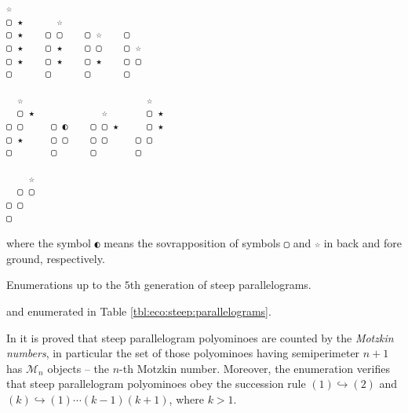 \begin{example}
\begin{margintable}
\begin{Verbatim}[baselinestretch=0.5,fontsize=\footnotesize]
☆
▢ ★      ☆
▢ ★    ▢ ▢    ▢ ☆    ▢
▢ ★    ▢ ★    ▢ ▢    ▢ ☆
▢ ★    ▢ ★    ▢ ★    ▢ ▢
▢      ▢      ▢      ▢

  ☆                      ☆
  ▢ ★            ☆       ▢ ★
▢ ▢     ▢ ◐    ▢ ▢ ★     ▢ ★
▢ ★     ▢ ▢    ▢ ▢     ▢ ▢
▢       ▢      ▢       ▢

    ☆
  ▢ ▢
▢ ▢
▢
\end{Verbatim}
where the symbol \verb|◐| means the sovrapposition of symbols \verb|▢| and
\verb|☆| in back and fore ground, respectively.
\caption{Enumerations up to the $5$th generation of steep parallelograms.}
\label{tbl:eco:steep:parallelograms}
\end{margintable}

and enumerated in Table \ref{tbl:eco:steep:parallelograms}.
\end{example}

In \citep{BARCUCCI199821} it is proved that steep parallelogram polyominoes are
counted by the \textit{Motzkin numbers}, in particular the set of those
polyominoes having semiperimeter $n+1$ has $\mathcal{M}_{n}$ objects -- the
$n$-th Motzkin number. Moreover, the enumeration verifies that steep
parallelogram polyominoes obey the succession rule $(1) \hookrightarrow (2)$
and $(k) \hookrightarrow (1)\cdots(k-1)(k+1)$, where $k>1$.

